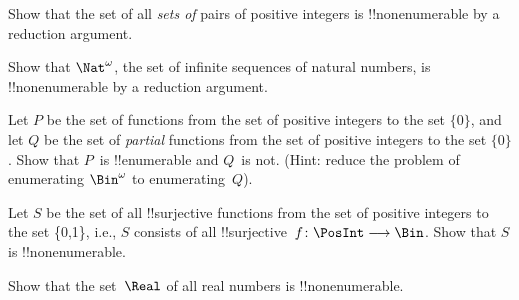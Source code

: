 \documentclass[../../../include/open-logic-section]{subfiles}
\begin{document}
\begin{prob}
Show that the set of all \emph{sets of} pairs of positive integers is
!!{nonenumerable} by a reduction argument.
\end{prob}

\begin{prob}
Show that $\Nat^\omega$, the set of infinite sequences of
natural numbers, is !!{nonenumerable} by a reduction argument.
\end{prob}

\begin{prob}
Let $P$ be the set of functions from the set of positive
integers to the set $\{0\}$, and let $Q$ be the set of \emph{partial}
functions from the set of positive integers to the set $\{0\}$. Show
that $P$~is !!{enumerable} and $Q$~is not. (Hint: reduce the problem
of enumerating $\Bin^\omega$ to enumerating~$Q$).
\end{prob}

\begin{prob}
Let $S$ be the set of all !!{surjective} functions from the set of
positive integers to the set \{0,1\}, i.e., $S$ consists of all
!!{surjective}~$f\colon \PosInt \to \Bin$.  Show that $S$ is
!!{nonenumerable}.
\end{prob}

\begin{prob}
Show that the set~$\Real$ of all real numbers is !!{nonenumerable}.
\end{prob}
\end{document}
